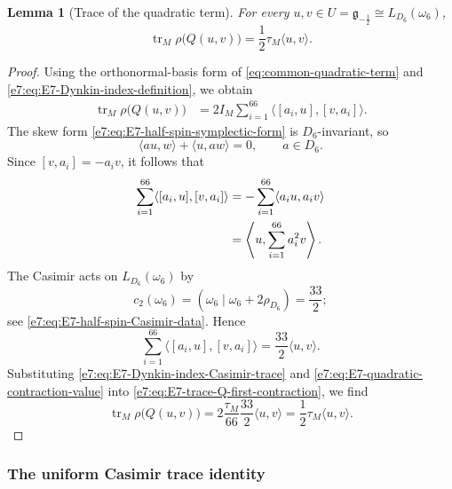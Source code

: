 \documentclass[11pt,reqno]{amsart}
\newtheorem{lemma}[theorem]{Lemma}
\theoremstyle{definition}
\theoremstyle{remark}
\begin{document}
\begin{lemma}[Trace of the quadratic term]
\label{e7:lem:E7-trace-quadratic-term}
For every $u,v\in U=\mathfrak g_{-\frac12}\cong L_{D_6}(\omega_6)$,
\begin{equation*}
  \operatorname{tr}_M\rho\bigl(Q(u,v)\bigr)
  =\frac12\tau_M\langle u,v\rangle.
\end{equation*}
\end{lemma}

\begin{proof}
Using the orthonormal-basis form of
\eqref{eq:common-quadratic-term} and
\eqref{e7:eq:E7-Dynkin-index-definition}, we obtain
\begin{align}
  \operatorname{tr}_M\rho\bigl(Q(u,v)\bigr)
  &=2I_M\sum_{i=1}^{66}
    \langle[a_i,u],[v,a_i]\rangle.
  \label{e7:eq:E7-trace-Q-first-contraction}
\end{align}
The skew form \eqref{e7:eq:E7-half-spin-symplectic-form} is $D_6$-invariant,
so
\begin{equation*}
  \langle au,w\rangle+\langle u,aw\rangle=0,
  \qquad a\in D_6.
\end{equation*}
Since $[v,a_i]=-a_iv$, it follows that
\begin{align*}
  \sum_{i=1}^{66}\langle[a_i,u],[v,a_i]\rangle
  &=-\sum_{i=1}^{66}\langle a_i u,a_i v\rangle
   \notag\\
  &=\left\langle
      u,\sum_{i=1}^{66}a_i^2v
    \right\rangle.
\end{align*}
The Casimir acts on $L_{D_6}(\omega_6)$ by
\begin{equation*}
  c_2(\omega_6)
  =(\omega_6\mid\omega_6+2\rho_{D_6})
  =\frac{33}{2};
\end{equation*}
see \eqref{e7:eq:E7-half-spin-Casimir-data}.  Hence
\begin{equation}
  \sum_{i=1}^{66}\langle[a_i,u],[v,a_i]\rangle
  =\frac{33}{2}\langle u,v\rangle.
  \label{e7:eq:E7-quadratic-contraction-value}
\end{equation}
Substituting
\eqref{e7:eq:E7-Dynkin-index-Casimir-trace} and
\eqref{e7:eq:E7-quadratic-contraction-value} into
\eqref{e7:eq:E7-trace-Q-first-contraction}, we find
\[
  \operatorname{tr}_M\rho\bigl(Q(u,v)\bigr)
  =2\frac{\tau_M}{66}\frac{33}{2}\langle u,v\rangle
  =\frac12\tau_M\langle u,v\rangle.
\]
\end{proof}

\subsubsection{The uniform Casimir trace identity}
\end{document}
